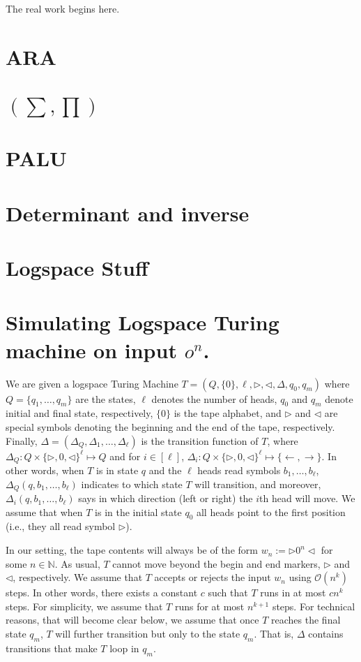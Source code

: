 The real work begins here.

\section{ARA}

\section{\lang$(\sum,\prod)$}

\section{PALU}

\section{Determinant and inverse}

\section{Logspace Stuff}

\section*{Simulating Logspace Turing machine on input $o^n$.}

We are given a logspace Turing Machine $T=\left(Q,\{0\},\ell,\rhd,\lhd,\Delta,q_0,q_m\right)$ where $Q=\{q_1,\ldots,q_m\}$ are the states, $\ell$ denotes the number of heads, $q_0$ and $q_m$ denote initial and final state, respectively, $\{0\}$ is the tape alphabet, and $\rhd$ and $\lhd$ are special symbols denoting the beginning and the end of the tape, respectively. Finally,
$\Delta=(\Delta_Q,\Delta_1,\ldots,\Delta_\ell)$ is the transition function of $T$, where $\Delta_Q:Q\times \{\rhd,0,\lhd\}^\ell\mapsto Q$ and for $i\in[\ell]$,
$\Delta_i:Q\times  \{\rhd,0,\lhd\}^\ell\mapsto\{\gets,\to\}$. In other words, when $T$ is in state $q$ and the $\ell$ heads read symbols $b_1,\ldots,b_\ell$, $\Delta_Q(q,b_1,\ldots,b_\ell)$ indicates to which state $T$ will transition, and moreover, $\Delta_i(q,b_1,\ldots,b_\ell)$ says in which direction (left or right) the $i$th head will move. We assume that when $T$ is in the initial state $q_0$ all heads point to the first position (i.e., they all read symbol $\rhd$). 

In our setting, the tape contents will always be of the form $w_n:=\rhd 0^n \lhd$ for some $n\in\mathbb{N}$. As usual, $T$ cannot move beyond the begin and end markers, $\rhd$ and $\lhd$, respectively. We assume that $T$ accepts or rejects the input $w_n$ using $\mathcal{O}(n^k)$ steps. In other words, there exists a constant $c$ such that $T$ runs in at most $cn^k$ steps. For simplicity, we assume that $T$ runs for at most $n^{k+1}$ steps. For technical reasons, that will become clear below, we assume that once $T$ reaches the final state $q_m$, $T$ will further transition but only to the state $q_m$. That is, $\Delta$ contains transitions that make $T$ loop in $q_m$.

